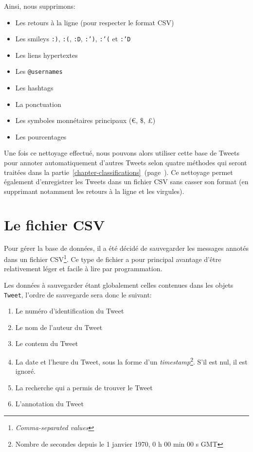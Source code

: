 \documentclass[12pt,a4paper]{report}
\begin{document}
Ainsi, nous supprimons:

\begin{itemize}
	\item
		Les retours à la ligne (pour respecter le format CSV)
	\item
		Les smileys \texttt{:)}, \texttt{:(}, \texttt{:D}, \texttt{:')},
		\texttt{:'(} et \texttt{:'D}
	\item
		Les liens hypertextes
	\item
		Les \texttt{@usernames}
	\item
		Les hashtags
	\item
		La ponctuation
	\item
		Les symboles monnétaires principaux (\euro, \$, £)
	\item
		Les pourcentages
\end{itemize}

Une fois ce nettoyage effectué, nous pouvons alors utiliser cette base de Tweets
pour annoter automatiquement d'autres Tweets selon quatre méthodes qui seront
traitées dans la
partie~\ref{chapter-classifications}~(page~\pageref{chapter-classifications}).
Ce nettoyage permet également d'enregistrer les Tweets dans un fichier CSV sans
casser son format (en supprimant notamment les retours à la ligne et les
virgules).

\section{Le fichier CSV}

Pour gérer la base de données, il a été décidé de sauvegarder les messages
annotés dans un fichier CSV\footnote{\textit{Comma-separated values}}. Ce type
de fichier a pour principal avantage d'être relativement léger et facile à lire
par programmation.

Les données à sauvegarder étant globalement celles contenues dans les objets
\texttt{Tweet}, l'ordre de sauvegarde sera donc le suivant:

\begin{enumerate}
	\item
		Le numéro d'identification du Tweet
	\item
		Le nom de l'auteur du Tweet
	\item
		Le contenu du Tweet
	\item
		La date et l'heure du Tweet, sous la forme d'un
		\textit{timestamp}\footnote{Nombre de secondes depuis le 
		1\ier{} janvier 1970, 0 h 00 min 00 s GMT}. S'il est nul, il est
		ignoré.
	\item
		La recherche qui a permis de trouver le Tweet
	\item
		L'annotation du Tweet
\end{enumerate}
\end{document}
